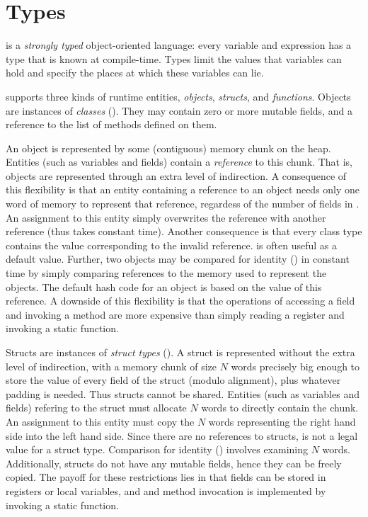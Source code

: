 \chapter{Types}
\label{XtenTypes}

{}\Xten{} is a {\em strongly typed} object-oriented language: every
variable and expression has a type that is known at compile-time.
Types limit the values that variables can hold and specify the places
at which these variables can lie.

{}\Xten{} supports three kinds of runtime entities, {\em objects},
{\em structs}, and {\em functions}. Objects are instances of {\em
  classes} (). They may contain zero or
more mutable fields, and a reference to the list of methods defined on them.

An object is represented by some (contiguous) memory chunk on the
heap. Entities (such as variables and fields) contain a {\em
  reference} to this chunk. That is, objects are represented through
an extra level of indirection.  A consequence of this flexibility is
that an entity containing a reference to an object  needs only
one word of memory to represent that reference, regardess of the
number of fields in . An assignment to this entity simply
overwrites the reference with another reference (thus takes constant
time). Another consequence is that every class type contains the value
 corresponding to the invalid reference.  is often
useful as a default value. Further, two objects may be compared for
identity (\Xcd{==}) in constant time by simply comparing references to
the memory used to represent the objects. The default hash code for an
object is based on the value of this reference. A downside of this
flexibility is that the operations of accessing a field and invoking a
method are more expensive than simply reading a register and
invoking a static function.


Structs are instances of {\em struct types} ().  A
struct is represented without the extra level of indirection, with a
memory chunk of size $N$ words precisely big enough to store the value
of every field of the struct (modulo alignment), plus whatever padding is needed. Thus structs cannot
be shared. Entities (such as variables and fields) refering to the
struct must allocate $N$ words to directly contain the chunk.  An
assignment to this entity must copy the $N$ words representing the
right hand side into the left hand side. Since there are no references
to structs,  is not a legal value for a struct
type. Comparison for identity (\Xcd{==}) involves examining $N$
words. Additionally, structs do not have any mutable fields, hence
they can be freely copied. The payoff for these restrictions lies in
that fields can be stored in registers or local variables, and 
and method invocation is implemented by invoking a static function.

